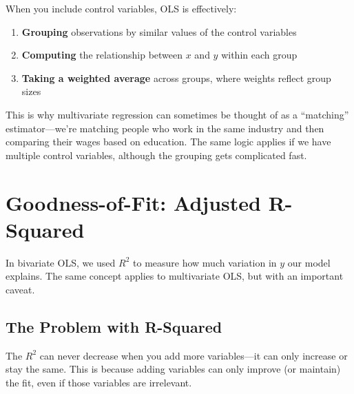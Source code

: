 \documentclass[
  letterpaper,
  DIV=11,
  numbers=noendperiod]{scrreprt}
\providecommand{\tightlist}{%
  \setlength{\itemsep}{0pt}\setlength{\parskip}{0pt}}
\begin{document}
\begin{tcolorbox}[enhanced jigsaw, arc=.35mm, bottomrule=.15mm, bottomtitle=1mm, breakable, colback=white, colbacktitle=quarto-callout-note-color!10!white, colframe=quarto-callout-note-color-frame, coltitle=black, left=2mm, leftrule=.75mm, opacityback=0, opacitybacktitle=0.6, rightrule=.15mm, title=\textcolor{quarto-callout-note-color}{\faInfo}\hspace{0.5em}{Multivariate OLS as Matching}, titlerule=0mm, toprule=.15mm, toptitle=1mm]

When you include control variables, OLS is effectively:

\begin{enumerate}
\def\labelenumi{\arabic{enumi}.}
\tightlist
\item
  \textbf{Grouping} observations by similar values of the control
  variables
\item
  \textbf{Computing} the relationship between \(x\) and \(y\) within
  each group
\item
  \textbf{Taking a weighted average} across groups, where weights
  reflect group sizes
\end{enumerate}

This is why multivariate regression can sometimes be thought of as a
``matching'' estimator---we're matching people who work in the same
industry and then comparing their wages based on education. The same
logic applies if we have multiple control variables, although the
grouping gets complicated fast.

\end{tcolorbox}

\section{Goodness-of-Fit: Adjusted
R-Squared}\label{goodness-of-fit-adjusted-r-squared}

In bivariate OLS, we used \(R^2\) to measure how much variation in \(y\)
our model explains. The same concept applies to multivariate OLS, but
with an important caveat.

\subsection{The Problem with
R-Squared}\label{the-problem-with-r-squared}

The \(R^2\) can never decrease when you add more variables---it can only
increase or stay the same. This is because adding variables can only
improve (or maintain) the fit, even if those variables are irrelevant.
\end{document}
